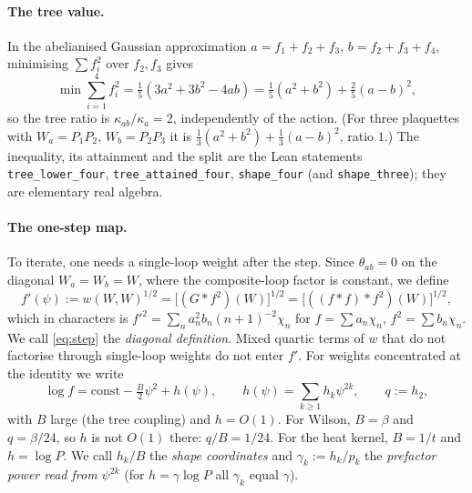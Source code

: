 \documentclass[11pt,a4paper]{article}
\theoremstyle{definition}
\theoremstyle{remark}
\newcommand{\code}[1]{\texttt{#1}}
\begin{document}
\paragraph{The tree value.}
In the abelianised Gaussian approximation $a=f_1+f_2+f_3$, $b=f_2+f_3+f_4$, minimising $\sum f_i^2$ over $f_2,f_3$ gives
\begin{equation}\label{eq:tree}
\min\sum_{i=1}^4 f_i^2=\tfrac15(3a^2+3b^2-4ab)=\tfrac15(a^2+b^2)+\tfrac25(a-b)^2 ,
\end{equation}
so the tree ratio is $\kappa_{ab}/\kappa_a=2$, independently of the action.
(For three plaquettes with $W_a=P_1P_2$, $W_b=P_2P_3$ it is $\tfrac13(a^2+b^2)+\tfrac13(a-b)^2$, ratio $1$.)
The inequality, its attainment and the split are the Lean statements \code{tree\_lower\_four}, \code{tree\_attained\_four}, \code{shape\_four} (and \code{shape\_three}); they are elementary real algebra.

\paragraph{The one-step map.}
To iterate, one needs a single-loop weight after the step.
Since $\theta_{ab}=0$ on the diagonal $W_a=W_b=W$, where the composite-loop factor is constant, we define
\begin{equation}\label{eq:step}
f'(\psi):=w(W,W)^{1/2}=\bigl[(G*f^2)(W)\bigr]^{1/2}=\bigl[((f*f)*f^2)(W)\bigr]^{1/2},
\end{equation}
which in characters is $f'^2=\sum_n a_n^2b_n(n+1)^{-2}\chi_n$ for $f=\sum a_n\chi_n$, $f^2=\sum b_n\chi_n$.
We call \eqref{eq:step} the \emph{diagonal definition}.
Mixed quartic terms of $w$ that do not factorise through single-loop weights do not enter $f'$.
For weights concentrated at the identity we write
\begin{equation}\label{eq:class}
\log f=\mathrm{const}-\tfrac{B}{2}\psi^2+h(\psi),\qquad h(\psi)=\sum_{k\ge1}h_k\psi^{2k},\qquad q:=h_2,
\end{equation}
with $B$ large (the tree coupling) and $h=O(1)$.
For Wilson, $B=\beta$ and $q=\beta/24$, so $h$ is not $O(1)$ there: $q/B=1/24$.
For the heat kernel, $B=1/t$ and $h=\log P$.
We call $h_k/B$ the \emph{shape coordinates} and $\gamma_k:=h_k/p_k$ the \emph{prefactor power read from $\psi^{2k}$} (for $h=\gamma\log P$ all $\gamma_k$ equal $\gamma$).
\end{document}
